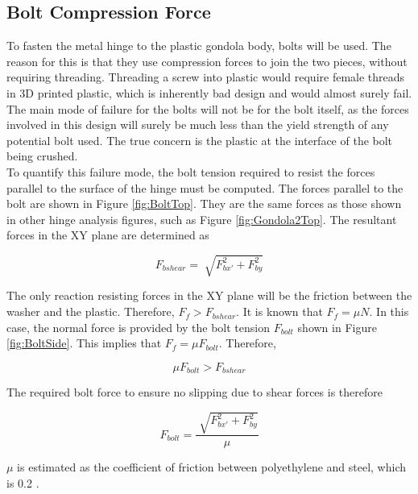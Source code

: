 \documentclass[../main.tex]{subfiles}
\begin{document}
\subsection{Bolt Compression Force} \label{compressive}
To fasten the metal hinge to the plastic gondola body, bolts will be used. The reason for this is that they use compression forces to join the two pieces, without requiring threading. Threading a screw into plastic would require female threads in 3D printed plastic, which is inherently bad design and would almost surely fail. \\

The main mode of failure for the bolts will not be for the bolt itself, as the forces involved in this design will surely be much less than the yield strength of any potential bolt used. The true concern is the plastic at the interface of the bolt being crushed. \\

To quantify this failure mode, the bolt tension required to resist the forces parallel to the surface of the hinge must be computed. The forces parallel to the bolt are shown in Figure \ref{fig:BoltTop}. They are the same forces as those shown in other hinge analysis figures, such as Figure \ref{fig:Gondola2Top}. The resultant forces in the XY plane are determined as 

\begin{displaymath}
F_{bshear} = \sqrt[]{F_{bx'}^2 + F_{by}^2}
\end{displaymath}

The only reaction resisting forces in the XY plane will be the friction between the washer and the plastic. Therefore, $F_f > F_{bshear}$. It is known that $F_f = \mu N$. In this case, the normal force is provided by the bolt tension $F_{bolt}$ shown in Figure \ref{fig:BoltSide}. This implies that $F_f = \mu F_{bolt}$. Therefore,

\begin{displaymath}
\mu F_{bolt} > F_{bshear}
\end{displaymath}

The required bolt force to ensure no slipping due to shear forces is therefore

\begin{equation}
F_{bolt} = \dfrac{\sqrt[]{F_{bx'}^2 + F_{by}^2}}{\mu}
\end{equation}

$\mu $ is estimated as the coefficient of friction between polyethylene and steel, which is 0.2 \cite{Friction}. \\
\end{document}
